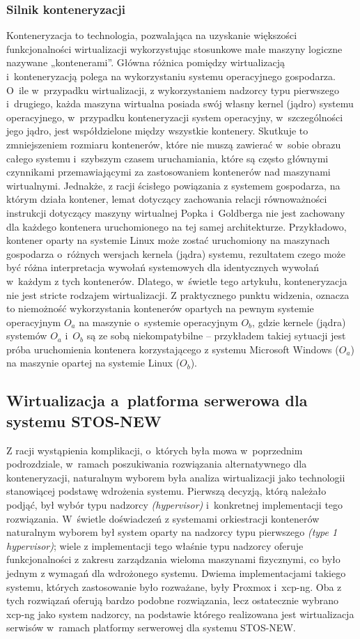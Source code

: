 \subsubsection{Silnik konteneryzacji}
Konteneryzacja to technologia, pozwalająca na uzyskanie większości funkcjonalności wirtualizacji wykorzystując stosunkowe małe maszyny logiczne nazywane „kontenerami”. Główna różnica pomiędzy wirtualizacją i~konteneryzacją polega na wykorzystaniu systemu operacyjnego gospodarza. O~ile w~przypadku wirtualizacji, z wykorzystaniem nadzorcy typu pierwszego i~drugiego, każda maszyna wirtualna posiada swój własny kernel (jądro) systemu operacyjnego, w~przypadku konteneryzacji system operacyjny, w~szczególności jego jądro, jest współdzielone między wszystkie kontenery. Skutkuje to zmniejszeniem rozmiaru kontenerów, które nie muszą zawierać w~sobie obrazu całego systemu i~szybszym czasem uruchamiania, które są często głównymi czynnikami przemawiającymi za zastosowaniem kontenerów nad maszynami wirtualnymi. Jednakże, z racji ścisłego powiązania z systemem gospodarza, na którym działa kontener, lemat dotyczący zachowania relacji równoważności instrukcji dotyczący maszyny wirtualnej Popka i~Goldberga\cite{virtualization} nie jest zachowany dla każdego kontenera uruchomionego na tej samej architekturze. Przykładowo, kontener oparty na systemie Linux może zostać uruchomiony na maszynach gospodarza o~różnych wersjach kernela (jądra) systemu, rezultatem czego może być różna interpretacja wywołań systemowych dla identycznych wywołań w~każdym z tych kontenerów. Dlatego, w~świetle tego artykułu, konteneryzacja nie jest stricte rodzajem wirtualizacji. Z praktycznego punktu widzenia, oznacza to niemożność wykorzystania kontenerów opartych na pewnym systemie operacyjnym $O_a$ na maszynie o~systemie operacyjnym $O_b$, gdzie kernele (jądra) systemów $O_a$ i~$O_b$ są ze sobą niekompatybilne -- przykładem takiej sytuacji jest próba uruchomienia kontenera korzystającego z systemu Microsoft Windows ($O_a$) na maszynie opartej na systemie Linux ($O_b$).

\subsection{Wirtualizacja a~platforma serwerowa dla systemu STOS-NEW}
Z racji wystąpienia komplikacji, o~których była mowa w~poprzednim podrozdziale, w~ramach poszukiwania rozwiązania alternatywnego dla konteneryzacji, naturalnym wyborem była analiza wirtualizacji jako technologii stanowiącej podstawę wdrożenia systemu. Pierwszą decyzją, którą należało podjąć, był wybór typu nadzorcy \textit{(hypervisor)} i~konkretnej implementacji tego rozwiązania. W~świetle doświadczeń z systemami orkiestracji kontenerów naturalnym wyborem był system oparty na nadzorcy typu pierwszego \textit{(type 1 hypervisor)}; wiele z implementacji tego właśnie typu nadzorcy oferuje funkcjonalności z zakresu zarządzania wieloma maszynami fizycznymi, co było jednym z wymagań dla wdrożonego systemu. Dwiema implementacjami takiego systemu, których zastosowanie było rozważane, były Proxmox i~xcp-ng\cite{proxmox, xcp}. Oba z tych rozwiązań oferują bardzo podobne rozwiązania, lecz ostatecznie wybrano xcp-ng jako system nadzorcy, na podstawie którego realizowana jest wirtualizacja serwisów w~ramach platformy serwerowej dla systemu STOS-NEW.
